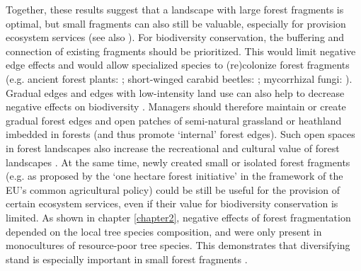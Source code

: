 \documentclass[10pt, twoside]{book} %
\begin{document}
	Together, these results suggest that a landscape with large forest fragments is optimal, but small fragments can also still be valuable, especially for provision ecosystem services (see also \citealt{ArroyoRodriguez2020, Valdes2020}). For biodiversity conservation, the buffering and connection of existing fragments should be prioritized. This would limit negative edge effects and would allow specialized species to (re)colonize forest fragments (e.g. ancient forest plants: \citealt{Honnay2002}; short-winged carabid beetles: \citealt{Desender1999}; mycorrhizal fungi: \citealt{Boeraeve2018}). Gradual edges and edges with low-intensity land use can also help to decrease negative effects on biodiversity \citep{Ries2004}. Managers should therefore maintain or create gradual forest edges and open patches of semi-natural grassland or heathland imbedded in forests (and thus promote `internal' forest edges). Such open spaces in forest landscapes also increase the recreational and cultural value of forest landscapes \citep{Tew2019}. At the same time, newly created small or isolated forest fragments (e.g. as proposed by the `one hectare forest initiative' in the framework of the EU's common agricultural policy) could be still be useful for the provision of certain ecosystem services, even if their value for biodiversity conservation is limited. As shown in chapter \ref{chapter2}, negative effects of forest fragmentation depended on the local tree species composition, and were only present in monocultures of resource-poor tree species. This demonstrates that diversifying stand is especially important in small forest fragments \citep{Hertzog2019}.\\
	
\end{document}
